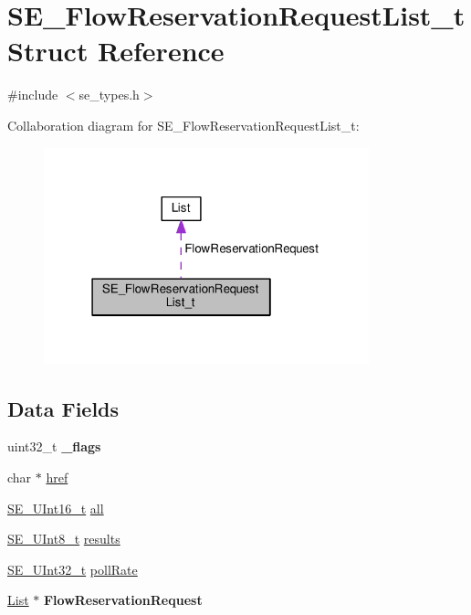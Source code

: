 \hypertarget{structSE__FlowReservationRequestList__t}{}\section{S\+E\+\_\+\+Flow\+Reservation\+Request\+List\+\_\+t Struct Reference}
\label{structSE__FlowReservationRequestList__t}


{\ttfamily \#include $<$se\+\_\+types.\+h$>$}



Collaboration diagram for S\+E\+\_\+\+Flow\+Reservation\+Request\+List\+\_\+t\+:\nopagebreak
\begin{figure}[H]
\begin{center}
\leavevmode
\includegraphics[width=267pt]{structSE__FlowReservationRequestList__t__coll__graph}
\end{center}
\end{figure}
\subsection*{Data Fields}
\begin{DoxyCompactItemize}
\item 
uint32\+\_\+t {\bfseries \+\_\+flags}
\item 
char $\ast$ \hyperlink{group__FlowReservationRequestList_ga4b986404c45f6995659822cc30a09aeb}{href}
\item 
\hyperlink{group__UInt16_gac68d541f189538bfd30cfaa712d20d29}{S\+E\+\_\+\+U\+Int16\+\_\+t} \hyperlink{group__FlowReservationRequestList_ga36c99aa80100cea5ffb0852b72adec6a}{all}
\item 
\hyperlink{group__UInt8_gaf7c365a1acfe204e3a67c16ed44572f5}{S\+E\+\_\+\+U\+Int8\+\_\+t} \hyperlink{group__FlowReservationRequestList_ga15c8b02101d4721254fb56573632a332}{results}
\item 
\hyperlink{group__UInt32_ga70bd4ecda3c0c85d20779d685a270cdb}{S\+E\+\_\+\+U\+Int32\+\_\+t} \hyperlink{group__FlowReservationRequestList_gae849ed542c4f144ffebb5351e300807c}{poll\+Rate}
\item 
\hyperlink{structList}{List} $\ast$ {\bfseries Flow\+Reservation\+Request}
\end{DoxyCompactItemize}


